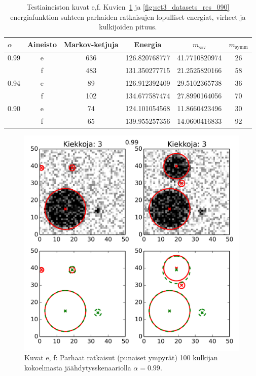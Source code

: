 \begin{table}[htpb]
    \centering
    \caption{Testiaineiston kuvat e,f. Kuvien~\ref{fig:set3_datasets_res_099} ja \ref{fig:set3_datasets_res_090} energiafunktion suhteen parhaiden ratkaisujen lopulliset energiat, virheet ja kulkijoiden pituus.
        \label{tab:3_res_errors}
    }
    \begin{tabular}{l c c c c c}
        $\alpha$ & Aineisto & Markov-ketjuja & Energia & $m_\text{sov}$ & $m_\text{symm}$ \\[2pt]
        \hline\noalign{\smallskip}
        0.99 & e & 636 & 126.820768777 & 41.7710820974 & 26 \\
             & f & 483 & 131.350277715 & 21.2525820166 & 58 \\[1pt]
        \hline\noalign{\smallskip}
        0.94 & e & 89  & 126.912392409 & 29.5102365738 & 36 \\
             & f & 102 & 134.677587474 & 27.8990164056 & 70 \\[1pt]
        \hline\noalign{\smallskip}
        0.90 & e & 74  & 124.101054568 & 11.8660423496 & 30 \\
             & f & 65  & 139.955257356 & 14.0600416833 & 92
    \end{tabular}
\end{table}

\begin{figure}[htpb]
    \centering
    \includegraphics[width=0.7\linewidth]{figures/set3_datasets_res_099.png}
    \caption{
        Kuvat e, f: Parhaat ratkaisut (punaiset ympyrät) 100 kulkijan kokoelmasta jäähdytysskenaariolla $\alpha = 0.99$.
        \label{fig:set3_datasets_res_099}
    }
\end{figure}


